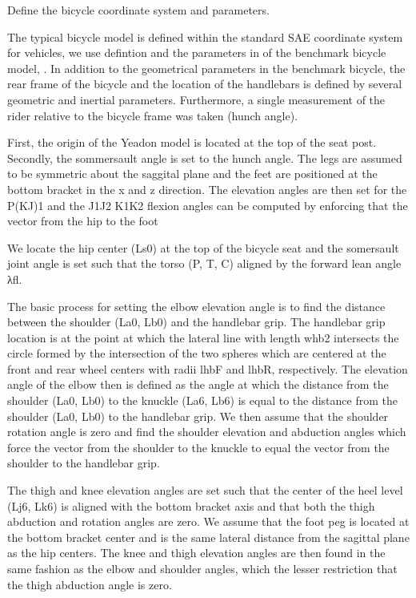 \documentclass[10pt]{article}
\begin{document}
Define the bicycle coordinate system and parameters.

The typical bicycle model is defined within the standard SAE coordinate system
for vehicles, we use defintion and the parameters in of the benchmark bicycle
model, \cite{Meijaard2007}. In addition to the geometrical parameters in the
benchmark bicycle, the rear frame of the bicycle and the location of the
handlebars is defined by several geometric and inertial parameters.
Furthermore, a single measurement of the rider relative to the bicycle frame
was taken (hunch angle).

First, the origin of the Yeadon model is located at the top of the seat post.
Secondly, the sommersault angle is set to the hunch angle. The legs are assumed
to be symmetric about the saggital plane and the feet are positioned at the
bottom bracket in the x and z direction. The elevation angles are then set for
the P(KJ)1 and the J1J2 K1K2 flexion angles can be computed by enforcing that
the vector from the hip to the foot

We locate the hip center (Ls0) at the top of the bicycle seat and the
somersault joint angle is set such that the torso (P, T, C) aligned by the
forward lean angle λfl.

The basic process for setting the elbow elevation angle is to find the distance
between the shoulder (La0, Lb0) and the handlebar grip. The handlebar grip
location is at the point at which the lateral line with length whb2 intersects
the circle formed by the intersection of the two spheres which are centered at
the front and rear wheel centers with radii lhbF and lhbR, respectively. The
elevation angle of the elbow then is defined as the angle at which the distance
from the shoulder (La0, Lb0) to the knuckle (La6, Lb6) is equal to the distance
from the shoulder (La0, Lb0) to the handlebar grip. We then assume that the
shoulder rotation angle is zero and find the shoulder elevation and abduction
angles which force the vector from the shoulder to the knuckle to equal the
vector from the shoulder to the handlebar grip.

The thigh and knee elevation angles are set such that the center of the heel
level (Lj6, Lk6) is aligned with the bottom bracket axis and that both the
thigh abduction and rotation angles are zero. We assume that the foot peg is
located at the bottom bracket center and is the same lateral distance from the
sagittal plane as the hip centers. The knee and thigh elevation angles are then
found in the same fashion as the elbow and shoulder angles, which the lesser
restriction that the thigh abduction angle is zero.
\end{document}
